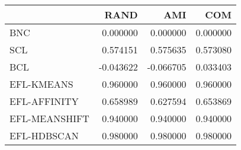 \begin{tabular}{lrrr}
\toprule
 & RAND & AMI & COM \\
\midrule
BNC & 0.000000 & 0.000000 & 0.000000 \\
SCL & 0.574151 & 0.575635 & 0.573080 \\
BCL & -0.043622 & -0.066705 & 0.033403 \\
EFL-KMEANS & 0.960000 & 0.960000 & 0.960000 \\
EFL-AFFINITY & 0.658989 & 0.627594 & 0.653869 \\
EFL-MEANSHIFT & 0.940000 & 0.940000 & 0.940000 \\
EFL-HDBSCAN & 0.980000 & 0.980000 & 0.980000 \\
\bottomrule
\end{tabular}
